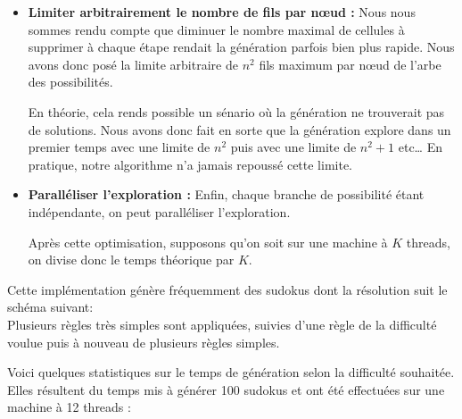 \documentclass[a4paper]{article}
\begin{document}
\begin{justify}
\begin{itemize}
        \item \textbf{Limiter arbitrairement le nombre de fils par nœud :} Nous nous sommes rendu compte que diminuer le nombre maximal de cellules à supprimer à chaque étape rendait la génération parfois bien plus rapide. Nous avons donc posé la limite arbitraire de $n^2$ fils maximum par nœud de l'arbe des possibilités.

        En théorie, cela rends possible un sénario où la génération ne trouverait pas de solutions. Nous avons donc fait en sorte que la génération explore dans un premier temps avec une limite de $n^2$ puis avec une limite de $n^2+1$ etc…
        En pratique, notre algorithme n'a jamais repoussé cette limite.

        \hypertarget{multithread}{}
        \item \textbf{Paralléliser l'exploration :} Enfin, chaque branche de possibilité étant indépendante, on peut paralléliser l'exploration. 
        
        \noindent Après cette optimisation, supposons qu'on soit sur une machine à $K$ threads, on divise donc le temps théorique par $K$.
    \end{itemize}

    \noindent Cette implémentation génère fréquemment des sudokus dont la résolution suit le schéma suivant: \\
    Plusieurs règles très simples sont appliquées, suivies d'une règle de la difficulté voulue puis à nouveau de plusieurs règles simples.
\end{justify}

\newpage
\begin{justify}
Voici quelques statistiques sur le temps de génération selon la difficulté souhaitée. Elles résultent du temps mis à générer 100 sudokus et ont été effectuées sur une machine à 12 threads :
\end{justify}
\end{document}
